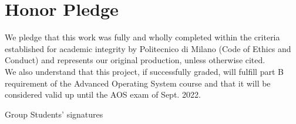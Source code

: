 \documentclass[10pt,a4]{article}
\begin{document}
\section{Honor Pledge}

We pledge that this work was fully and wholly completed within the criteria
established for academic integrity by Politecnico di Milano (Code of Ethics and
Conduct) and represents our original production, unless otherwise cited.\\
We also understand that this project, if successfully graded, will fulfill part B requirement of the
Advanced Operating System course and that it will be considered valid up until
the AOS exam of Sept. 2022. 

\begin{flushright}
Group Students' signatures
\end{flushright}
\end{document}
